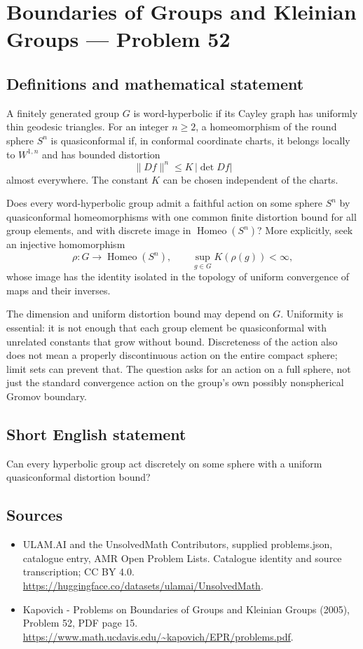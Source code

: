 \documentclass[11pt,a4paper]{article}
\begin{document}
\section*{Boundaries of Groups and Kleinian Groups — Problem 52}\label{statement}

\subsection{Definitions and mathematical statement}
A finitely generated group $G$ is word-hyperbolic if its Cayley graph has uniformly thin geodesic triangles. For an integer $n\geq2$, a homeomorphism of the round sphere $S^n$ is quasiconformal if, in conformal coordinate charts, it belongs locally to $W^{1,n}$ and has bounded distortion
\[
 \lVert Df\rVert^n\leq K\,|\det Df|
\]
almost everywhere. The constant $K$ can be chosen independent of the charts.

Does every word-hyperbolic group admit a faithful action on some sphere $S^n$ by quasiconformal homeomorphisms with one common finite distortion bound for all group elements, and with discrete image in $\operatorname{Homeo}(S^n)$? More explicitly, seek an injective homomorphism
\[
 \rho:G\longrightarrow\operatorname{Homeo}(S^n),\qquad
 \sup_{g\in G}K(\rho(g))<\infty,
\]
whose image has the identity isolated in the topology of uniform convergence of maps and their inverses.

The dimension and uniform distortion bound may depend on $G$. Uniformity is essential: it is not enough that each group element be quasiconformal with unrelated constants that grow without bound. Discreteness of the action also does not mean a properly discontinuous action on the entire compact sphere; limit sets can prevent that. The question asks for an action on a full sphere, not just the standard convergence action on the group's own possibly nonspherical Gromov boundary.
\subsection{Short English statement}
Can every hyperbolic group act discretely on some sphere with a uniform quasiconformal distortion bound?
\subsection{Sources}
\begin{itemize}
\item[S1] ULAM.AI and the UnsolvedMath Contributors, supplied problems.json, catalogue entry, AMR Open Problem Lists. Catalogue identity and source transcription; CC BY 4.0.
\url{https://huggingface.co/datasets/ulamai/UnsolvedMath}.
\item[S2] Kapovich - Problems on Boundaries of Groups and Kleinian Groups (2005), Problem 52, PDF page 15. 
\url{https://www.math.ucdavis.edu/~kapovich/EPR/problems.pdf}.
\end{itemize}
\end{document}
